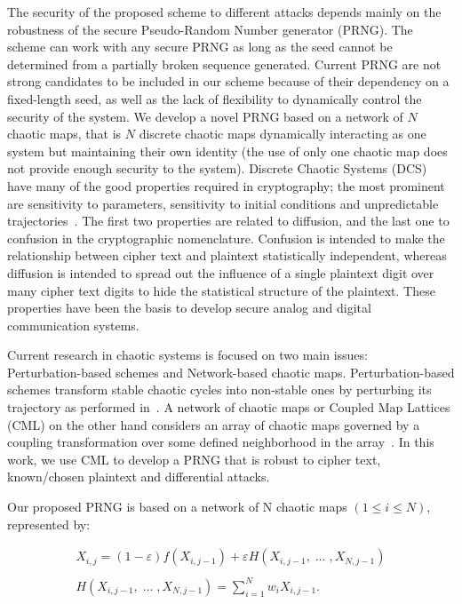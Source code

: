 \documentclass[preprint]{elsarticle}
\begin{document}
The security of the proposed scheme to different attacks depends mainly on the robustness of the secure Pseudo-Random Number generator (PRNG). The scheme can work with any secure PRNG as long as the seed cannot be determined from a partially broken sequence generated. Current PRNG are not strong candidates to be included in our scheme because of their dependency on a fixed-length seed, as well as the lack of flexibility to dynamically control the security of the system. We develop a novel PRNG based on a network of $N$ chaotic maps, that is $N$ discrete chaotic maps dynamically interacting as one system but maintaining their own identity (the use of only one chaotic map does not provide enough security to the system). Discrete Chaotic Systems (DCS) have many of the good properties required in cryptography; the most prominent are sensitivity to parameters, sensitivity to initial conditions and unpredictable trajectories~\cite{Meyer1995}. The first two properties are related to diffusion, and the last one to confusion in the cryptographic nomenclature. Confusion is intended to make the relationship between cipher text and plaintext statistically independent, whereas diffusion is intended to spread out the influence of a single plaintext digit over many cipher text digits to hide the statistical structure of the plaintext. These properties have been the basis to develop secure analog and digital communication systems.

Current research in chaotic systems is focused on two main issues: \\Perturbation-based schemes and Network-based chaotic maps. Perturbation-based schemes transform stable chaotic cycles into non-stable ones by perturbing its trajectory as performed in~\cite{Meyer1995}. A network of chaotic maps or Coupled Map Lattices (CML) on the other hand considers an array of chaotic maps governed by a coupling transformation over some defined neighborhood in the array~\cite{Hasimoto2008}. In this work, we use CML to develop a PRNG that is robust to cipher text, known/chosen plaintext and differential attacks.

Our proposed PRNG is based on a network of N chaotic maps $(1 \leq i \leq N)$, represented by:

\begin{equation}
\begin{array}{c}
\displaystyle{
X_{i,j}= (1-\varepsilon)f(X_{i,j-1})+ \varepsilon H(X_{i,j-1},\; \ldots \;,X_{N,j-1 } )
}
 \\ \\
\displaystyle{
H(X_{i,j-1},\; \ldots \;,X_{N, j-1})= \sum_{i=1}^{N}w_{i}X_{i,j-1}.
}
\end{array}
\label{ec1}
\end{equation}
\end{document}
